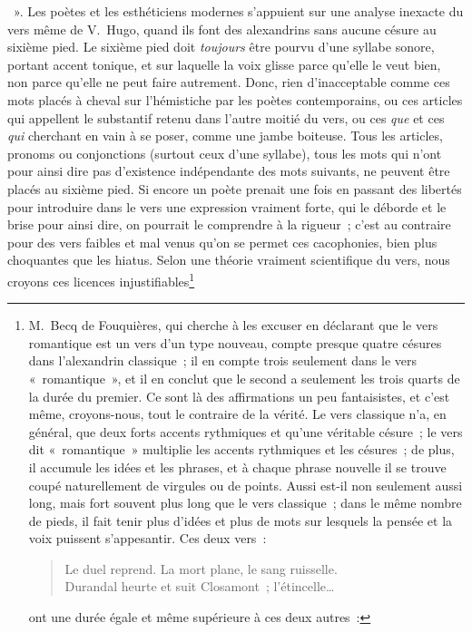 \documentclass[french,twoside]{book} %
\begin{document}
{{} »}. Les poètes et les esthéticiens modernes s’appuient sur une analyse inexacte du vers même de V. Hugo, quand ils font des alexandrins sans aucune césure au sixième pied. Le sixième pied doit \emph{toujours} être pourvu d’une syllabe sonore, portant accent tonique, et sur laquelle la voix glisse parce qu’elle le veut bien, non parce qu’elle ne peut faire autrement. Donc, rien d’inacceptable comme ces mots placés à cheval sur l’hémistiche par les poètes contemporains, ou ces articles qui appellent le substantif retenu dans l’autre moitié du vers, ou ces \emph{que} et ces \emph{qui} cherchant en vain à se poser, comme une jambe boiteuse. Tous les articles, pronoms ou conjonctions (surtout ceux d’une syllabe), tous les mots qui n’ont pour ainsi dire pas d’existence indépendante des mots suivants, ne peuvent être placés au sixième pied. Si encore un poète prenait une fois en passant des libertés pour introduire dans le vers une expression vraiment forte, qui le déborde et le brise pour ainsi dire, on pourrait le comprendre à la rigueur ; c’est au contraire  pour des vers faibles et mal venus qu’on se permet ces cacophonies, bien plus choquantes que les hiatus. Selon une théorie vraiment scientifique du vers, nous croyons ces licences injustifiables\footnote{\noindent M. Becq de Fouquières, qui cherche à les excuser en déclarant que le vers romantique est un vers d’un type nouveau, compte presque quatre césures dans l’alexandrin classique ; il en compte trois seulement dans le vers « romantique », et il en conclut que le second a seulement les trois quarts de la durée du premier. Ce sont là des affirmations un peu fantaisistes, et c’est même, croyons-nous, tout le contraire de la vérité. Le vers classique n’a, en général, que deux forts accents rythmiques et qu’une véritable césure ; le vers dit « romantique » multiplie les accents rythmiques et les césures ; de plus, il accumule les idées et les phrases, et à chaque phrase nouvelle il se trouve coupé naturellement de virgules ou de points. Aussi est-il non seulement aussi long, mais fort souvent plus long que le vers classique ; dans le même nombre de pieds, il fait tenir plus d’idées et plus de mots sur lesquels la pensée et la voix puissent s’appesantir. Ces deux vers :\par

\begin{verse}
Le duel reprend. La mort plane, le sang ruisselle.\\
Durandal heurte et suit Closamont ; l’étincelle…\\
\end{verse}
\par
\noindent ont une durée égale et même supérieure à ces deux autres :\par

}
\end{document}
